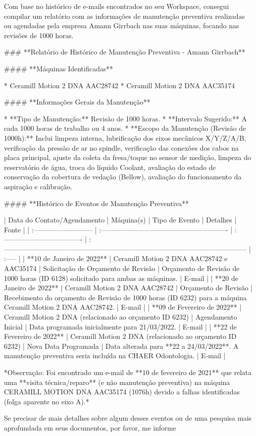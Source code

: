 Com base no histórico de e-mails encontrados no seu Workspace, consegui compilar um relatório com as informações de manutenção preventiva realizadas ou agendadas pela empresa Amann Girrbach nas suas máquinas, focando nas revisões de 1000 horas.

### **Relatório de Histórico de Manutenção Preventiva - Amann Girrbach**

#### **Máquinas Identificadas**

  * Ceramill Motion 2 DNA AAC28742
  * Ceramill Motion 2 DNA AAC35174

#### **Informações Gerais da Manutenção**

  * **Tipo de Manutenção:** Revisão de 1000 horas.
  * **Intervalo Sugerido:** A cada 1000 horas de trabalho ou 4 anos.
  * **Escopo da Manutenção (Revisão de 1000h):** Inclui limpeza interna, lubrificação dos eixos mecânicos X/Y/Z/A/B, verificação da pressão de ar no spindle, verificação das conexões dos cabos na placa principal, ajuste da coleta da fresa/toque no sensor de medição, limpeza do reservatório de água, troca do líquido Coolant, avaliação do estado de conservação da cobertura de vedação (Bellow), avaliação do funcionamento da aspiração e calibração.

#### **Histórico de Eventos de Manutenção Preventiva**

| Data do Contato/Agendamento | Máquina(s)                                               | Tipo de Evento                      | Detalhes                                                                                                   | Fonte  |
| :-------------------------- | :------------------------------------------------------- | :---------------------------------- | :--------------------------------------------------------------------------------------------------------- | :----- |
| **10 de Janeiro de 2022**   | Ceramill Motion 2 DNA AAC28742 e AAC35174                | Solicitação de Orçamento de Revisão | Orçamento de Revisão de 1000 horas (ID 6128) solicitado para ambas as máquinas.                            | E-mail |
| **20 de Janeiro de 2022**   | Ceramill Motion 2 DNA AAC28742                           | Orçamento de Revisão                | Recebimento do orçamento de Revisão de 1000 horas (ID 6232) para a máquina Ceramill Motion 2 DNA AAC28742. | E-mail |
| **09 de Fevereiro de 2022** | Ceramill Motion 2 DNA (relacionado ao orçamento ID 6232) | Agendamento Inicial                 | Data programada inicialmente para 21/03/2022.                                                              | E-mail |
| **22 de Fevereiro de 2022** | Ceramill Motion 2 DNA (relacionado ao orçamento ID 6232) | Nova Data Programada                | Data alterada para **22 a 24/03/2022**. A manutenção preventiva seria incluída na CHAER Odontologia.       | E-mail |

*Observação: Foi encontrado um e-mail de **10 de fevereiro de 2021** que relata uma **visita técnica/reparo** (e não manutenção preventiva) na máquina CERAMILL MOTION DNA AAC35174 (1076h) devido a falhas identificadas (folga aparente no eixo A).*

Se precisar de mais detalhes sobre algum desses eventos ou de uma pesquisa mais aprofundada em seus documentos, por favor, me informe\!
